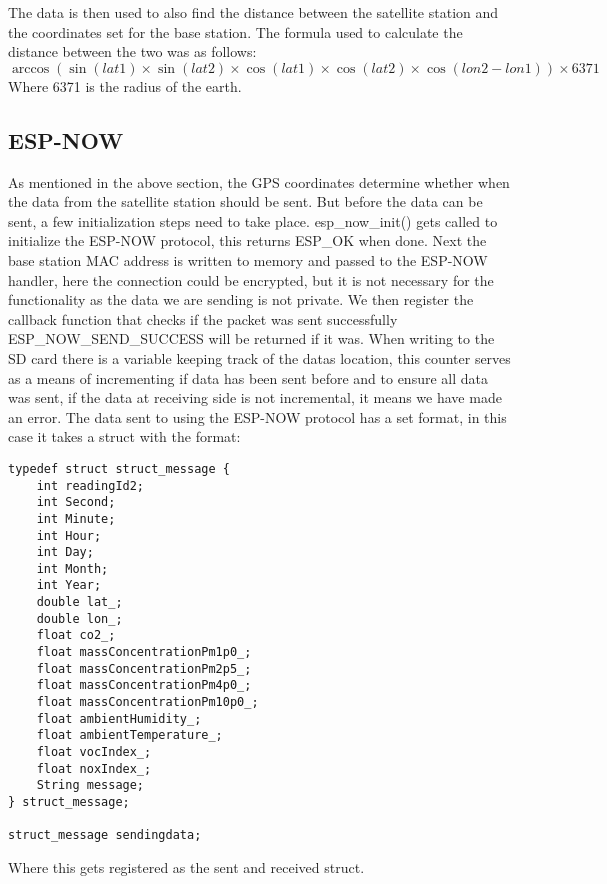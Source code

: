 \noindent
The data is then used to also find the distance between the satellite station and the coordinates set for the base station. The formula used to calculate the distance between the two was as follows:
\begin{equation}\label{eq:distance}
	\arccos(\sin(lat1)\times\sin(lat2)\times\cos(lat1)\times\cos(lat2)\times\cos(lon2-lon1)) \times 6371
\end{equation}
Where 6371 is the radius of the earth.

\subsection{ESP-NOW}
As mentioned in the above section, the GPS coordinates determine whether when the data from the satellite station should be sent. But before the data can be sent, a few initialization steps need to take place.
esp\_now\_init() gets called to initialize the ESP-NOW protocol, this returns ESP\_OK when done. Next the base station MAC address is written to memory and passed to the ESP-NOW handler, here the connection could be encrypted, but it is not necessary for the functionality as the data we are sending is not private. We then register the callback function that checks if the packet was sent successfully ESP\_NOW\_SEND\_SUCCESS will be returned if it was. When writing to the SD card there is a variable keeping track of the datas location, this counter serves as a means of incrementing if data has been sent before and to ensure all data was sent, if the data at receiving side is not incremental, it means we have made an error. The data sent to using the ESP-NOW protocol has a set format, in this case it takes a struct with the format:

\begin{lstlisting}
typedef struct struct_message {
	int readingId2;
	int Second;
	int Minute;
	int Hour;
	int Day;
	int Month;
	int Year;
	double lat_;
	double lon_;
	float co2_;
	float massConcentrationPm1p0_;
	float massConcentrationPm2p5_;
	float massConcentrationPm4p0_;
	float massConcentrationPm10p0_;
	float ambientHumidity_;
	float ambientTemperature_;
	float vocIndex_;
	float noxIndex_;  
	String message;
} struct_message;

struct_message sendingdata;
\end{lstlisting}
\noindent
Where this gets registered as the sent and received struct. 

